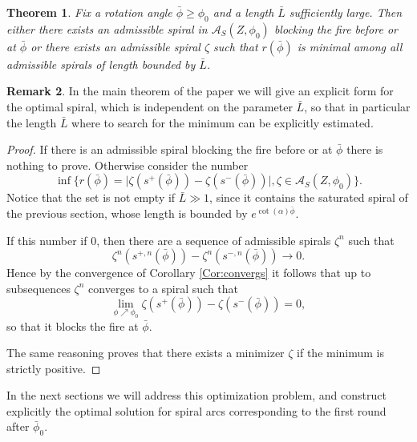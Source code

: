 \documentclass[reqno]{amsart}
\theoremstyle{definition} \newtheorem{definition}{Definition}[section]
\theoremstyle{definition} \newtheorem{remark}[definition]{Remark}
\theoremstyle{plain} \newtheorem{lemma}[definition]{Lemma}
\theoremstyle{plain} \newtheorem{proposition}[definition]{Proposition}
\theoremstyle{plain} \newtheorem{theorem}[definition]{Theorem}
\theoremstyle{plain} \newtheorem{corollary}[definition]{Corollary}
\theoremstyle{definition} \newtheorem{example}[definition]{Example}
\theoremstyle{plain} \newtheorem{claim}[clai]{Claim}
\theoremstyle{definition} \newtheorem{assumption}[definition]{Assumption}
\theoremstyle{definition} \newtheorem{observation}[definition]{Observation}
\newcommand{\1}{\mathbbm 1}
\numberwithin{equation}{section} %
\theoremstyle{plain} \newtheorem*{theorem*}{Theorem}
\theoremstyle{plain} \newtheorem{mthm}[maintheorem]{Main Theorem}
\theoremstyle{plain} \newtheorem*{mthm*}{Main Theorem}
\theoremstyle{plain} \newtheorem*{conjecture*}{Conjecture}
\theoremstyle{plain} \newtheorem{conjecture}[definition]{Conjecture}
\theoremstyle{plain} \newtheorem*{problem*}{Problem}
\begin{document}
\begin{theorem}
\label{Theo:exists_min}
Fix a rotation angle ${\bar \phi} \geq {\phi_0}$ and a length $\bar L$ sufficiently large. Then either there exists an admissible spiral in $\mathcal A_S(Z,{\phi_0})$ blocking the fire before or at ${\bar \phi}$ or there exists an admissible spiral $\zeta$ such that $r({\bar \phi})$ is minimal among all admissible spirals of length bounded by $\bar L$.
\end{theorem}

\begin{remark}
\label{Rem:lenght}
In the main theorem of the paper we will give an explicit form for the optimal spiral, which is independent on the parameter $\bar L$, so that in particular the length $\bar L$ where to search for the minimum can be explicitly estimated.
\end{remark}

\begin{proof}
If there is an admissible spiral blocking the fire before or at ${\bar \phi}$ there is nothing to prove. Otherwise consider the number
\begin{equation*}
\inf \Big\{ r({\bar \phi}) = \big| \zeta(s^+({\bar \phi})) - \zeta(s^-({\bar \phi})) \big|, \zeta \in \mathcal A_S(Z,{\phi_0}) \Big\}.
\end{equation*}
Notice that the set is not empty if $\bar L \gg 1$, since it contains the saturated spiral of the previous section, whose length is bounded by $e^{\cot(\alpha) \bar \phi}$.

If this number if $0$, then there are a sequence of admissible spirals $\zeta^n$ such that
\begin{equation*}
\zeta^n(s^{+,n}({\bar \phi})) - \zeta^n(s^{-,n}({\bar \phi})) \to 0.
\end{equation*}
Hence by the convergence of Corollary \ref{Cor:convergs} it follows that up to subsequences $\zeta^n$ converges to a spiral such that
\begin{equation*}
\lim_{\phi \nearrow {\phi_0}} \zeta(s^+({\bar \phi})) - \zeta(s^-({\bar \phi})) = 0,
\end{equation*}
so that it blocks the fire at ${\bar \phi}$.

The same reasoning proves that there exists a minimizer $\zeta$ if the minimum is strictly positive.
\end{proof}

In the next sections we will address this optimization problem, and construct explicitly the optimal solution for spiral arcs corresponding to the first round after $\bar \phi_0$.
\end{document}
